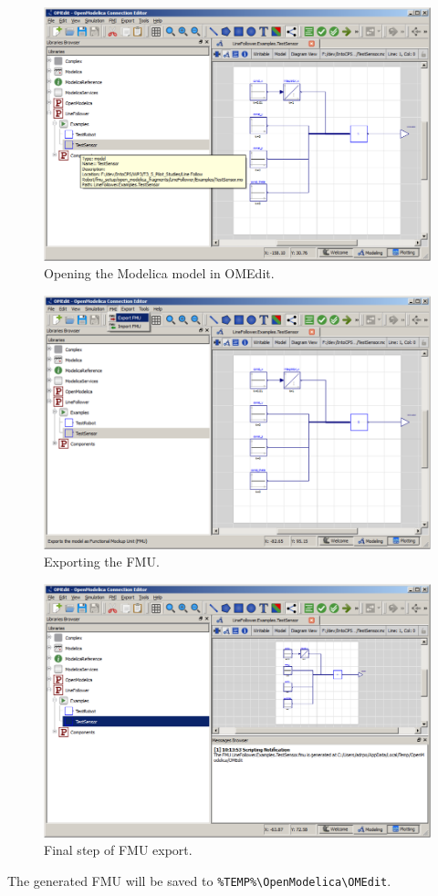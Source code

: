 %
%
%
\begin{figure}[ht]
	\centerline{\includegraphics[width=12.5cm]{figures/OMEdit_3.png}}
	\caption{Opening the Modelica model in OMEdit.}
	\label{figure:OMEdit_3}
\end{figure}
%
%
%
\begin{figure}[ht]
	\centerline{\includegraphics[width=12.5cm]{figures/OMEdit_4.png}}
	\caption{Exporting the FMU.}
	\label{figure:OMEdit_4}
\end{figure}
%
%
%
\begin{figure}[ht]
	\centerline{\includegraphics[width=12.5cm]{figures/OMEdit_5.png}}
	\caption{Final step of FMU export.}
	\label{figure:OMEdit_5}
\end{figure}
%
%
%
The generated FMU will be saved to \texttt{\%{}TEMP\%{}\textbackslash{}OpenModelica\textbackslash{}OMEdit}.
\clearpage
